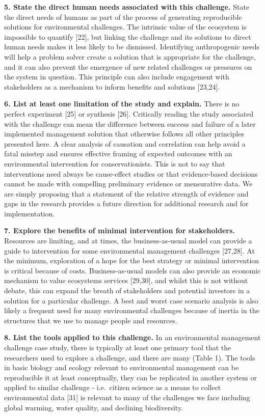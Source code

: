 \documentclass[10pt,letterpaper]{article}
\begin{document}
\textbf{5. State the direct human needs associated with this challenge.}
State the direct needs of humans as part of the process of generating
reproducible solutions for environmental challenges. The intrinsic value
of the ecosystem is impossible to quantify {[}22{]}, but linking the
challenge and its solutions to direct human needs makes it less likely
to be dismissed. Identifying anthropogenic needs will help a problem
solver create a solution that is appropriate for the challenge, and it
can also prevent the emergence of new related challenges or pressures on
the system in question. This principle can also include engagement with
stakeholders as a mechanism to inform benefits and solutions
{[}23,24{]}.

\textbf{6. List at least one limitation of the study and explain.} There
is no perfect experiment {[}25{]} or synthesis {[}26{]}. Critically
reading the study associated with the challenge can mean the difference
between success and failure of a later implemented management solution
that otherwise follows all other principles presented here. A clear
analysis of causation and correlation can help avoid a fatal misstep and
ensures effective framing of expected outcomes with an environmental
intervention for conservationists. This is not to say that interventions
need always be cause-effect studies or that evidence-based decisions
cannot be made with compelling preliminary evidence or mensurative data.
We are simply proposing that a statement of the relative strength of
evidence and gaps in the research provides a future direction for
additional research and for implementation.

\textbf{7. Explore the benefits of minimal intervention for
stakeholders.} Resources are limiting, and at times, the
business-as-usual model can provide a guide to intervention for some
environmental management challenges {[}27,28{]}. At the minimum,
exploration of a hope for the best strategy or minimal intervention is
critical because of costs. Business-as-usual models can also provide an
economic mechanism to value ecosystems services {[}29,30{]}, and whilst
this is not without debate, this can expand the breath of stakeholders
and potential investors in a solution for a particular challenge. A best
and worst case scenario analysis is also likely a frequent need for many
environmental challenges because of inertia in the structures that we
use to manage people and resources.

\textbf{8. List the tools applied to this challenge.} In an
environmental management challenge case study, there is typically at
least one primary tool that the researchers used to explore a challenge,
and there are many (Table 1). The tools in basic biology and ecology
relevant to environmental management can be reproducible it at least
conceptually, they can be replicated in another system or applied to
similar challenge - i.e.~citizen science as a means to collect
environmental data {[}31{]} is relevant to many of the challenges we
face including global warming, water quality, and declining
biodiversity.
\end{document}
